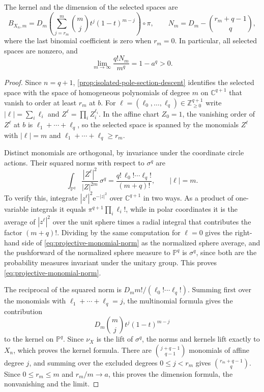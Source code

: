 \begin{proposition}\label{prop:hopf-point-binomial-kernel}
The kernel and the dimension of the selected spaces are
\[
 B_{X_n,m}=D_m\left(
          \sum_{j=r_m}^{m}\binom mj t^j(1-t)^{m-j}\right)\circ\pi,
 \qquad
 N_m=D_m-\binom{r_m+q-1}{q},
\]
where the last binomial coefficient is zero when $r_m=0$. In particular, all selected spaces are nonzero, and
\[
 \lim_{m\to\infty}\frac{q!N_m}{m^q}=1-a^q>0.
\]
\end{proposition}
\begin{proof}
Since $n=q+1$, \cref{prop:isolated-pole-section-descent} identifies the selected space with the space of homogeneous polynomials of degree $m$ on $\mathbb C^{q+1}$ that vanish to order at least $r_m$ at $b$. For $\ell=(\ell_0,\ldots,\ell_q)\in\mathbb Z_{\geq0}^{q+1}$ write $|\ell|=\sum_i\ell_i$ and $Z^\ell=\prod_iZ_i^{\ell_i}$. In the affine chart $Z_0=1$, the vanishing order of $Z^\ell$ at $b$ is $\ell_1+\cdots+\ell_q$, so the selected space is spanned by the monomials $Z^\ell$ with $|\ell|=m$ and $\ell_1+\cdots+\ell_q\geq r_m$.

Distinct monomials are orthogonal, by invariance under the coordinate circle actions. Their squared norms with respect to $\sigma^q$ are
\begin{equation}\label{eq:projective-monomial-norm}
 \int_{\mathbb P^q}\frac{|Z^\ell|^2}{|Z|^{2m}}\,\sigma^q
       =\frac{q!\,\ell_0!\cdots\ell_q!}{(m+q)!},
 \qquad |\ell|=m.
\end{equation}
To verify this, integrate $|z^\ell|^2\mathrm{e}^{-|z|^2}$ over $\mathbb C^{q+1}$ in two ways. As a product of one-variable integrals it equals $\pi^{q+1}\prod_i\ell_i!$, while in polar coordinates it is the average of $|z^\ell|^2$ over the unit sphere times a radial integral that contributes the factor $(m+q)!$. Dividing by the same computation for $\ell=0$ gives the right-hand side of \eqref{eq:projective-monomial-norm} as the normalized sphere average, and the pushforward of the normalized sphere measure to $\mathbb P^q$ is $\sigma^q$, since both are the probability measures invariant under the unitary group. This proves \eqref{eq:projective-monomial-norm}.

The reciprocal of the squared norm is $D_mm!/(\ell_0!\cdots\ell_q!)$. Summing first over the monomials with $\ell_1+\cdots+\ell_q=j$, the multinomial formula gives the contribution
\[
 D_m\binom mj t^j(1-t)^{m-j}
\]
to the kernel on $\mathbb P^q$. Since $\nu_X$ is the lift of $\sigma^q$, the norms and kernels lift exactly to $X_n$, which proves the kernel formula. There are $\binom{j+q-1}{q-1}$ monomials of affine degree $j$, and summing over the excluded degrees $0\leq j<r_m$ gives $\binom{r_m+q-1}{q}$. Since $0\leq r_m\leq m$ and $r_m/m\to a$, this proves the dimension formula, the nonvanishing and the limit.
\end{proof}

